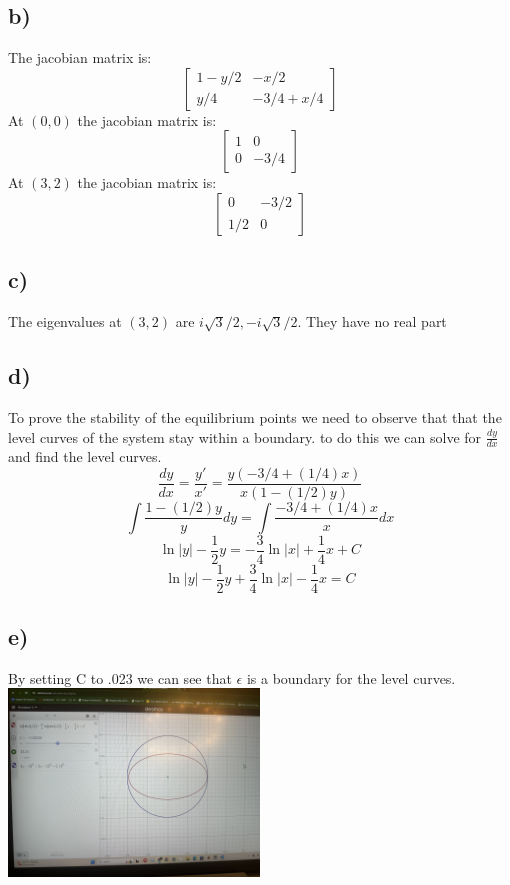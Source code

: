 \documentclass{article}
\begin{document}
\subsection*{b)}
The jacobian matrix is: $$\begin{bmatrix}
1-y/2 & -x/2\\
y/4 & -3/4+x/4
\end{bmatrix}$$
At $(0,0)$ the jacobian matrix is: $$\begin{bmatrix}
1 & 0\\
0 & -3/4
\end{bmatrix}$$
At $(3,2)$ the jacobian matrix is: $$\begin{bmatrix}
0 & -3/2\\
1/2 & 0
\end{bmatrix}$$
\subsection*{c)}
The eigenvalues at $(3,2)$ are $i\sqrt{3}/2,- i\sqrt{3}/2$. They have no real part
\subsection*{d)}
To prove the stability of the equilibrium points we need to observe that that the level curves of the system stay within a boundary. to do this we can solve for $\frac{dy}{dx}$ and find the level curves. 
$$\frac{dy}{dx} = \frac{y'}{x'} = \frac{y(-3/4+(1/4)x)}{x(1-(1/2)y)} $$
$$\int \frac{1-(1/2)y}{y}dy = \int \frac{-3/4+(1/4)x}{x}dx$$
$$\ln|y| - \frac{1}{2}y =  -\frac{3}{4}\ln|x| + \frac{1}{4}x + C$$
$$\ln|y| - \frac{1}{2}y +\frac{3}{4}\ln|x| - \frac{1}{4}x = C$$

\subsection*{e)}
By setting C to .023 we can see that $\epsilon$ is a boundary for the level curves.
\includegraphics[width=0.5\textwidth]{IMG_2810.jpg}
\end{document}
